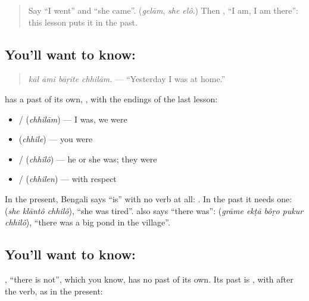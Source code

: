 \label{lesson:BN-C264-chhilam}



\begin{quote}
Say \textquotedblleft{}I went\textquotedblright{} and \textquotedblleft{}she came\textquotedblright{}. (\emph{gelām}, \emph{she elô}.) Then \textbf{}, \textquotedblleft{}I am, I am there\textquotedblright{}: this lesson puts it in the past.
\end{quote}

\subsection*{You'll want to know: }
\begin{quote}
\textbf{   }
\end{quote}

\begin{quote}
\emph{kāl āmi bāṛite chhilām.} — \textquotedblleft{}Yesterday I was at home.\textquotedblright{}
\end{quote}

\textbf{} has a past of its own, \textbf{}, with the endings of the last lesson:

\begin{itemize}
\raggedright
  \item \textbf{} / \textbf{} \textbf{} (\emph{chhilām}) — I was, we were
  \item \textbf{} \textbf{} (\emph{chhile}) — you were
  \item \textbf{} / \textbf{} \textbf{} (\emph{chhilô}) — he or she was; they were
  \item \textbf{} / \textbf{} \textbf{} (\emph{chhilen}) — with respect
\end{itemize}

In the present, Bengali says \textquotedblleft{}is\textquotedblright{} with no verb at all: \textbf{ }. In the past it needs one: \textbf{  } (\emph{she klāntô chhilô}), \textquotedblleft{}she was tired\textquotedblright{}. \textbf{} also says \textquotedblleft{}there was\textquotedblright{}: \textbf{    } (\emph{grāme ekṭā bôṛo pukur chhilô}), \textquotedblleft{}there was a big pond in the village\textquotedblright{}.

\subsection*{You'll want to know:  }
\textbf{}, \textquotedblleft{}there is not\textquotedblright{}, which you know, has no past of its own. Its past is \textbf{ }, with \textbf{} after the verb, as in the present:

